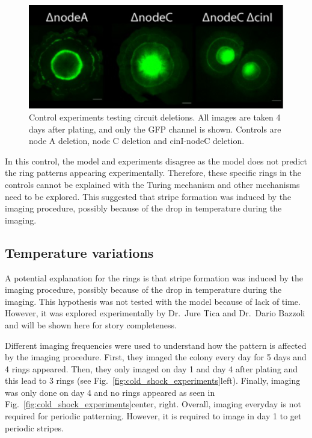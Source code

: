 \begin{figure}[H] %
    \centering
    \begin{adjustbox}{center}
        \includegraphics[width=1.1\textwidth]{chapters/Chapter 3/experimental_node_dele} %
    \end{adjustbox}
    \caption{Control experiments testing circuit deletions. All images are taken 4 days after plating, and only the GFP channel is shown. Controls are node A deletion, node C deletion and cinI-nodeC deletion.}
    \label{fig:experimental_node_dele}
\end{figure}

In this control, the model and experiments disagree as the model does not predict the ring patterns appearing experimentally.
Therefore, these specific rings in the controls cannot be explained with the Turing mechanism and other mechanisms need to be explored.
This suggested that stripe formation was induced by the imaging procedure, possibly because of the drop in temperature during the imaging.
\subsection{Temperature variations}
A potential explanation for the rings is that stripe formation was induced by the imaging procedure, possibly because of the drop in temperature during the imaging.
This hypothesis was not tested with the model because of lack of time.
However, it was explored experimentally by Dr.~Jure Tica and Dr.~Dario Bazzoli and will be shown here for story completeness.

Different imaging frequencies were used to understand how the pattern is affected by the imaging procedure.
First, they imaged the colony every day for 5 days and 4 rings appeared.
Then, they only imaged on day 1 and day 4 after plating and this lead to 3 rings (see Fig.~\ref{fig:cold_shock_experiments}left).
Finally, imaging was only done on day 4 and no rings appeared as seen in Fig.~\ref{fig:cold_shock_experiments}center, right.
Overall, imaging everyday is not required for periodic patterning.
However, it is required to image in day 1 to get periodic stripes.




